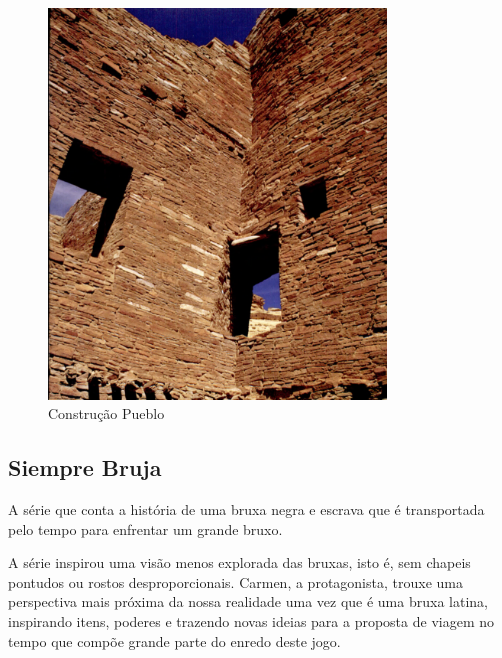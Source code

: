 \begin{figure}[!htb] \caption{\label{fig_puebloan}Construção Pueblo} \begin{center}
\includegraphics[width=0.8\textwidth]{imagens/puebloans.png} \end{center}
 \end{figure}

\clearpage

\subsection{Siempre Bruja}

A série que conta a história de uma bruxa negra e escrava que é transportada pelo tempo para enfrentar um grande bruxo.

A série inspirou uma visão menos explorada das bruxas, isto é, sem chapeis pontudos ou rostos desproporcionais. Carmen, a protagonista, trouxe uma perspectiva mais próxima da nossa realidade uma vez que é uma bruxa latina, inspirando itens, poderes e trazendo novas ideias para a proposta de viagem no tempo que compõe grande parte do enredo deste jogo.

